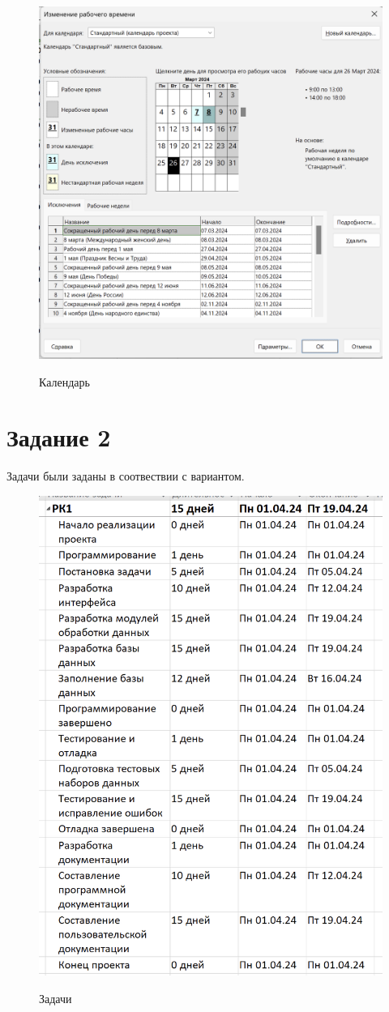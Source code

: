 \begin{figure}[ht!]
	\includegraphics[width=0.75\linewidth]{assets/images/1-calendar.png}
	\label{fig:r2}
	\caption{Календарь}
\end{figure}
\FloatBarrier

\section{Задание 2}

Задачи были заданы в соотвествии с вариантом.

\begin{figure}[ht!]
	\includegraphics[width=0.75\linewidth]{assets/images/2-tasks.png}
	\label{fig:r2}
	\caption{Задачи}
\end{figure}
\FloatBarrier



